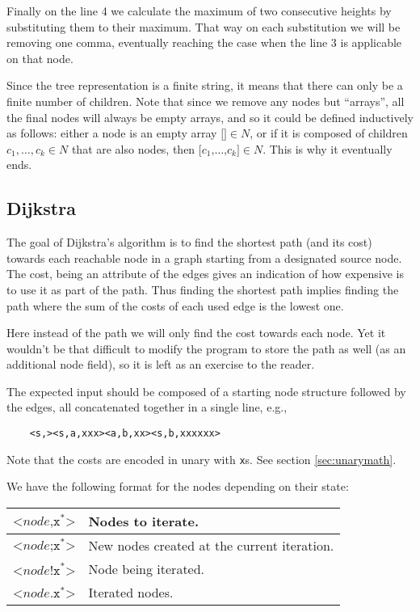 Finally on the line 4 we calculate the maximum of two consecutive heights
by substituting them to their maximum.  That way on each substitution we
will be removing one comma, eventually reaching the case when the line 3
is applicable on that node.

Since the tree representation is a finite string, it means that there can
only be a finite number of children.  Note that since we remove any nodes
but ``arrays'', all the final nodes will always be empty arrays, and so
it could be defined inductively as follows:
either a node is an empty array $\texttt{[]}\in N$, or if it is
composed of children $c_1, \ldots, c_k\in N$ that are also nodes, then
$\texttt{[}c_1\texttt{,}\ldots\texttt{,}c_k\texttt{]} \in N$.  This is why
it eventually ends.

\subsection{Dijkstra}

The goal of Dijkstra's algorithm is to find the shortest path (and its
cost) towards each reachable node in a graph starting from a designated
source node.  The cost, being an attribute of the edges gives an
indication of how expensive is to use it as part of the path.  Thus
finding the shortest path implies finding the path where the sum of
the costs of each used edge is the lowest one.

Here instead of the path we will only find the cost towards each node.
Yet it wouldn't be that difficult to modify the program
to store the path as well (as an additional node field), so it is left
as an exercise to the reader.

The expected input should be composed of a starting node structure
followed by the edges, all concatenated together in a single line, e.g.,

\begin{Verbatim}
	<s,><s,a,xxx><a,b,xx><s,b,xxxxxx>
\end{Verbatim}

Note that the costs are encoded in unary with {\tt x}s.
See section \ref{sec:unarymath}.


We have the following format for the nodes depending on their state:
\begin{center}
	\begin{tabular}{|l|l|}
		\hline
		$\texttt{<}node\texttt{,x}^*\texttt{>}$ & Nodes to iterate.\\
		\hline
		$\texttt{<}node\texttt{;x}^*\texttt{>}$
			& New nodes created at the current iteration.\\
		\hline
		$\texttt{<}node\texttt{!x}^*\texttt{>}$ & Node being iterated.\\
		\hline
		$\texttt{<}node\texttt{.x}^*\texttt{>}$ & Iterated nodes.\\
		\hline
	\end{tabular}
\end{center}

